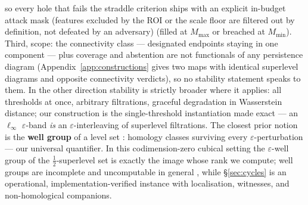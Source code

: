 \documentclass[10pt]{article}
\newcommand{\eps}{\varepsilon}
\begin{document}
so every hole that fails the straddle criterion ships with an explicit
in-budget attack mask (features excluded by the ROI or the scale floor are
filtered out by definition, not defeated by an adversary)
(filled at $M_{\max}$ or breached at $M_{\min}$). Third, scope: the
connectivity class --- designated endpoints staying in one component ---
plus coverage and abstention are not functionals of any persistence
diagram (Appendix~\ref{app:constructions} gives two maps with identical
superlevel diagrams and opposite connectivity verdicts), so no stability
statement speaks to them. In the other direction stability is strictly
broader where it applies: all thresholds at once, arbitrary filtrations,
graceful degradation in Wasserstein distance; our construction is the
single-threshold instantiation made exact --- an $\ell_\infty$
$\eps$-band \emph{is} an $\eps$-interleaving of superlevel filtrations.
The closest prior notion is the \textbf{well group} of a level set
\citep{emp2011wellgroups,bendich2013levelsets}: homology classes
surviving every $\eps$-perturbation --- our universal quantifier. In this
codimension-zero cubical setting the $\eps$-well group of the
$\tfrac12$-superlevel set is exactly the image whose rank we compute;
well groups are incomplete and uncomputable in general
\citep{franek2015wellgroups}, while \S\ref{sec:cycles} is an operational,
implementation-verified instance with localisation, witnesses, and
non-homological companions.
\end{document}
